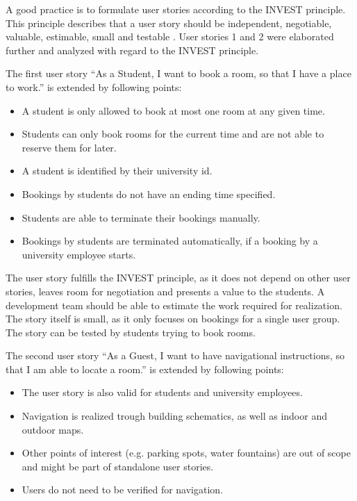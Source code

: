 \documentclass[conference,onecolumn]{IEEEtran}
\begin{document}
A good practice is to formulate user stories according to the INVEST principle.
This principle describes that a user story should be independent, negotiable, valuable, estimable, small and testable \cite{Buglione_2013}.
User stories 1 and 2 were elaborated further and analyzed with regard to the INVEST principle.

The first user story ``As a Student, I want to book a room, so that I have a place to work.'' is extended by following points:

\begin{itemize}
	\item A student is only allowed to book at most one room at any given time.
	\item Students can only book rooms for the current time and are not able to reserve them for later.
	\item A student is identified by their university id.
	\item Bookings by students do not have an ending time specified.
	\item Students are able to terminate their bookings manually.
	\item Bookings by students are terminated automatically, if a booking by a university employee starts.
\end{itemize}

The user story fulfills the INVEST principle, as it does not depend on other user stories, leaves room for negotiation and presents a value to the students.
A development team should be able to estimate the work required for realization. The story itself is small, as it only focuses on bookings for a single user group.
The story can be tested by students trying to book rooms.

The second user story ``As a Guest, I want to have navigational instructions, so that I am able to locate a room.'' is extended by following points:

\begin{itemize}
	\item The user story is also valid for students and university employees.
	\item Navigation is realized trough  building schematics, as well as indoor and outdoor maps.
	\item Other points of interest (e.g. parking spots, water fountains) are out of scope and might be part of standalone user stories.
	\item Users do not need to be verified for navigation.
\end{itemize}
\end{document}
